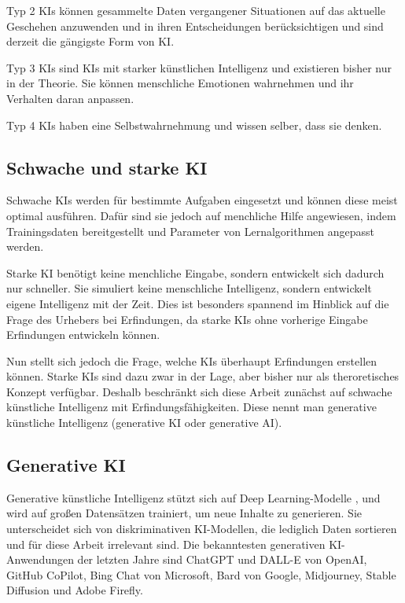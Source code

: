 Typ 2 KIs können gesammelte Daten vergangener 
Situationen auf das aktuelle Geschehen anzuwenden und 
in ihren Entscheidungen berücksichtigen und sind derzeit die gängigste Form von KI.

Typ 3 KIs sind KIs mit starker künstlichen Intelligenz und 
existieren bisher nur in der Theorie. 
Sie können menschliche Emotionen wahrnehmen und ihr Verhalten daran anpassen.

Typ 4 KIs haben eine Selbstwahrnehmung und wissen selber, dass sie denken. 
\cite{stadlerKuenstlicheIntelligenz}

\subsection{Schwache und starke KI}

Schwache KIs werden für bestimmte Aufgaben eingesetzt und 
können diese meist optimal ausführen. 
Dafür sind sie jedoch auf menchliche Hilfe angewiesen, 
indem Trainingsdaten bereitgestellt und 
Parameter von Lernalgorithmen angepasst werden.

Starke KI benötigt keine menchliche Eingabe, 
sondern entwickelt sich dadurch nur schneller. 
Sie simuliert keine menschliche Intelligenz, 
sondern entwickelt eigene Intelligenz mit der Zeit. 
Dies ist besonders spannend im Hinblick auf die Frage 
des Urhebers bei Erfindungen, 
da starke KIs ohne vorherige Eingabe Erfindungen entwickeln können.
\cite{WasIstStarke2023}

Nun stellt sich jedoch die Frage,
welche KIs überhaupt 
Erfindungen erstellen können. Starke KIs sind dazu zwar in 
der Lage, aber bisher nur als theroretisches Konzept verfügbar. 
Deshalb beschränkt sich diese Arbeit zunächst auf schwache künstliche Intelligenz
mit Erfindungsfähigkeiten. Diese nennt man generative künstliche Intelligenz 
(generative KI oder generative AI).

\subsection{Generative KI}
Generative künstliche Intelligenz 
stützt sich auf Deep Learning-Modelle , 
und wird auf großen Datensätzen trainiert, um neue Inhalte zu generieren.  
Sie unterscheidet sich von diskriminativen KI-Modellen, 
die lediglich Daten sortieren und für diese Arbeit irrelevant sind. 
Die bekanntesten generativen KI-Anwendungen der letzten Jahre sind
ChatGPT und DALL-E von OpenAI, GitHub CoPilot, Bing Chat von Microsoft, 
Bard von Google, Midjourney, Stable Diffusion und Adobe Firefly. \cite{WasIstGenerative}

